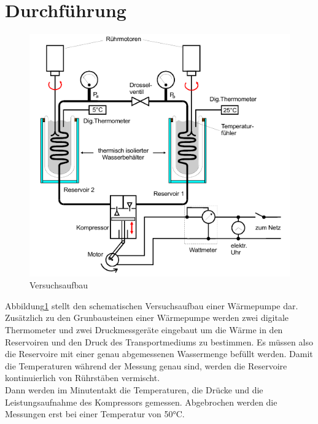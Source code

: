 \section{Durchführung}
\label{sec:Durchführung}

\begin{figure}
    \centering
    \includegraphics{WärmepumpeDurchführung.png}
    \caption{Versuchsaufbau}
    \label{fig:aufbau}
\end{figure}
Abbildung\ref{fig:aufbau} stellt den schematischen Versuchsaufbau einer
Wärmepumpe dar.\\
Zusätzlich zu den Grunbausteinen einer Wärmepumpe werden zwei digitale Thermometer 
und zwei Druckmessgeräte eingebaut um die Wärme in den Reservoiren und den Druck des 
Transportmediums zu bestimmen. Es müssen also die Reservoire mit einer genau abgemessenen
Wassermenge befüllt werden. Damit die Temperaturen während
der Messung genau sind, werden die Reservoire kontinuierlich
von Rührstäben vermischt. \\
Dann werden im Minutentakt die Temperaturen, die Drücke und
die Leistungsaufnahme des Kompressors gemessen. Abgebrochen 
werden die Messungen erst bei einer Temperatur von 50°C.

